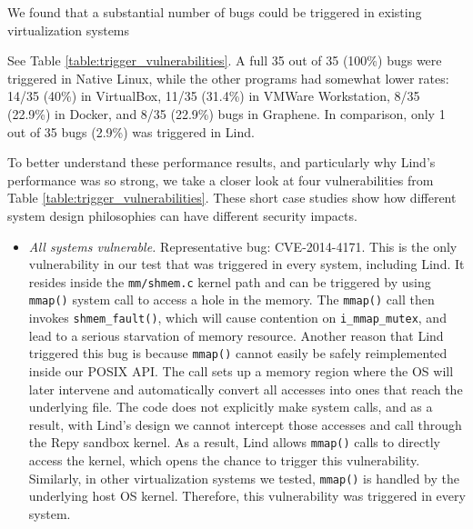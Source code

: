 We found that a substantial number of bugs could be triggered in existing
virtualization systems {See Table \ref{table:trigger_vulnerabilities}.
A full 35 out of 35 (100\%) bugs were triggered in Native Linux,
while the other programs had somewhat lower rates: 14/35 (40\%) in
VirtualBox,
11/35 (31.4\%)  in VMWare Workstation, 8/35 (22.9\%)  in Docker, and 8/35
(22.9\%) bugs in Graphene.
In comparison, only 1 out of 35 bugs  (2.9\%) was triggered in Lind.

To better understand these performance results, and particularly why Lind's
performance was so strong, we take a closer look at four
vulnerabilities from Table \ref{table:trigger_vulnerabilities}. These short case
studies show how different system design philosophies can have
 different security impacts.

\begin{itemize}

\item \emph{All systems vulnerable.}  Representative bug: CVE-2014-4171.
This is the only vulnerability in our test that was triggered in every
system, including Lind. It resides inside the \texttt{mm/shmem.c} kernel path and
can be triggered by using \texttt{mmap()} system call to access a hole in the memory.
The \texttt{mmap()} call then invokes \texttt{shmem\_fault()}, which will cause contention
on \texttt{i\_mmap\_mutex}, and lead to a serious starvation of memory resource.
Another reason that Lind triggered this bug is because \texttt{mmap()} cannot easily
be safely reimplemented inside our POSIX API. The call sets up a
memory region where the OS will later
intervene and automatically convert all accesses into ones that reach the
underlying file.  The code does not explicitly make system calls, and as
a result, with Lind's design we cannot intercept those accesses and call through
the Repy sandbox kernel. As a result,
Lind allows \texttt{mmap()} calls to directly access the kernel, which
opens the chance to trigger this vulnerability. Similarly, in other
virtualization systems we tested, \texttt{mmap()} is handled by the underlying
host OS kernel.
Therefore, this vulnerability was triggered in every system.


\end{itemize}}

